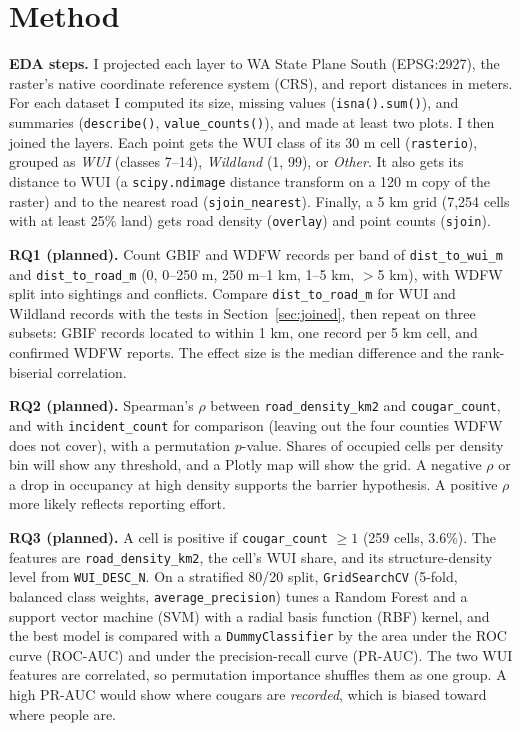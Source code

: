 \documentclass[11pt, a4paper]{article}
\begin{document}
\section{Method}
\label{sec:method}
\textbf{EDA steps.} I projected each layer to WA State Plane South (EPSG:2927), the raster's native coordinate reference system (CRS), and report distances in meters. For each dataset I computed its size, missing values (\texttt{isna().sum()}), and summaries (\texttt{describe()}, \texttt{value\_counts()}), and made at least two plots. I then joined the layers. Each point gets the WUI class of its 30 m cell (\texttt{rasterio}), grouped as \emph{WUI} (classes 7--14), \emph{Wildland} (1, 99), or \emph{Other}. It also gets its distance to WUI (a \texttt{scipy.ndimage} distance transform on a 120 m copy of the raster) and to the nearest road (\texttt{sjoin\_nearest}). Finally, a 5 km grid (7,254 cells with at least 25\% land) gets road density (\texttt{overlay}) and point counts (\texttt{sjoin}).

\medskip
\noindent\textbf{RQ1 (planned).} Count GBIF and WDFW records per band of \texttt{dist\_to\_wui\_m} and \texttt{dist\_to\_road\_m} (0, 0--250 m, 250 m--1 km, 1--5 km, $>$5 km), with WDFW split into sightings and conflicts. Compare \texttt{dist\_to\_road\_m} for WUI and Wildland records with the tests in Section~\ref{sec:joined}, then repeat on three subsets: GBIF records located to within 1 km, one record per 5 km cell, and confirmed WDFW reports. The effect size is the median difference and the rank-biserial correlation.

\medskip
\noindent\textbf{RQ2 (planned).} Spearman's $\rho$ between \texttt{road\_density\_km2} and \texttt{cougar\_count}, and with \texttt{incident\_count} for comparison (leaving out the four counties WDFW does not cover), with a permutation $p$-value. Shares of occupied cells per density bin will show any threshold, and a Plotly map will show the grid. A negative $\rho$ or a drop in occupancy at high density supports the barrier hypothesis. A positive $\rho$ more likely reflects reporting effort.

\medskip
\noindent\textbf{RQ3 (planned).} A cell is positive if \texttt{cougar\_count} $\ge 1$ (259 cells, 3.6\%). The features are \texttt{road\_density\_km2}, the cell's WUI share, and its structure-density level from \texttt{WUI\_DESC\_N}. On a stratified 80/20 split, \texttt{GridSearchCV} (5-fold, balanced class weights, \texttt{average\_precision}) tunes a Random Forest and a support vector machine (SVM) with a radial basis function (RBF) kernel, and the best model is compared with a \texttt{DummyClassifier} by the area under the ROC curve (ROC-AUC) and under the precision-recall curve (PR-AUC). The two WUI features are correlated, so permutation importance shuffles them as one group. A high PR-AUC would show where cougars are \emph{recorded}, which is biased toward where people are.
\end{document}

